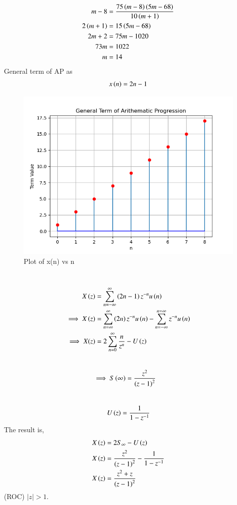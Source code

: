 \documentclass[journal,12pt,twocolumn]{IEEEtran}
\theoremstyle{remark}
\begin{document}
 \begin{align}
    m-8&=\frac{75\left(m-8\right)\left(5m-68\right)}{10\left(m+1\right)}\\
    2\left(m+1\right)&=15\left(5m-68\right)\\
    2m+2&=75m-1020\\
    73m&=1022\\
    m&=14
 \end{align}
General term of AP as 
\begin{align}
    x\left(n\right)=2n-1
\end{align}
\begin{figure}[!h]
    \centering
    \includegraphics[width=1.0\linewidth]{test.png}
    \caption{Plot of x(n) vs n}
    \label{fig:1}
\end{figure}
\\
\begin{align}
    X\left(z\right)&=\sum_{n=-\infty}^{\infty}\left(2n-1\right)z^{-n}u\left(n\right) \\ \implies X\left(z\right)&=\sum_{n=\infty}^{\infty}\left(2n\right)z^{-n}u\left(n\right) -\sum_{n=-\infty}^{n=\infty}z^{-n}u\left(n\right)\\
   \implies X(z)&=2\sum_{n=0}^{\infty}\dfrac{n}{z^{n}}-U\left(z\right)
\end{align}
\\
\begin{align}
   \implies S\left(\infty\right)&=\dfrac{z^2}{\left(z-1\right)^{2}}
\end{align}
\\
\begin{align}
   U\left(z\right)=\dfrac{1}{1-z^{-1}}
\end{align}
The result is,
\begin{align}
    X\left(z\right)&=2S_\infty-U\left(z\right)\\
    X\left(z\right)&=\dfrac{z^2}{\left(z-1\right)^{2}}-\dfrac{1}{1-z^{-1}}\\
    X\left(z\right)&=\dfrac{z^2+z}{\left(z-1\right)^{2}}
\end{align}
(ROC) \(|z| > 1\).\\
\end{document}
